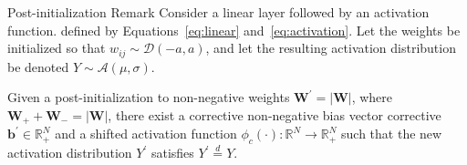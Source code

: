 
    



\begin{frame}{Post-initialization Remark}
	 Consider a linear layer followed by an activation function. defined by
   Equations~\ref{eq:linear} and~\ref{eq:activation}. Let the weights be
   initialized so that \(w_{ij} \sim \mathcal{D}(-a, a)\), and let the resulting
   activation distribution be denoted \(Y \sim \mathcal{A}(\mu, \sigma)\). 

    Given a post-initialization to non-negative weights \(\bm{W}^{'}=
    |\bm{W}|\), where \(\bm{W}_{+} + \bm{W}_{-} = |\bm{W}|\), there exist a
    corrective non-negative bias vector corrective \(\bm{b}^{'} \in
    \mathbb{R}_{+}^{N}\) and a shifted activation function \(\phi_c(\cdot):
    \mathbb{R}^{N} \rightarrow \mathbb{R}^{N}_{+}\) such that the new activation
    distribution \( Y^{'}\) satisfies \(Y^{'}\stackrel{d}{=}Y\). 
\end{frame}


